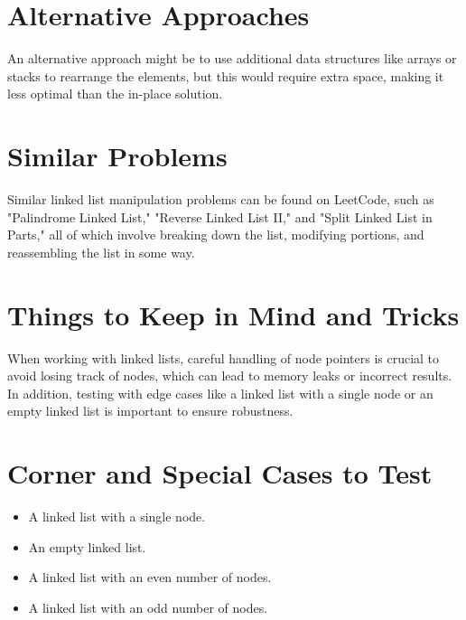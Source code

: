 \section*{Alternative Approaches}
An alternative approach might be to use additional data structures like arrays or stacks to rearrange the elements, but this would require extra space, making it less optimal than the in-place solution.

\section*{Similar Problems}
Similar linked list manipulation problems can be found on LeetCode, such as "Palindrome Linked List," "Reverse Linked List II," and "Split Linked List in Parts," all of which involve breaking down the list, modifying portions, and reassembling the list in some way.

\section*{Things to Keep in Mind and Tricks}
When working with linked lists, careful handling of node pointers is crucial to avoid losing track of nodes, which can lead to memory leaks or incorrect results. In addition, testing with edge cases like a linked list with a single node or an empty linked list is important to ensure robustness.

\section*{Corner and Special Cases to Test}
\begin{itemize}
    \item A linked list with a single node.
    \item An empty linked list.
    \item A linked list with an even number of nodes.
    \item A linked list with an odd number of nodes.
\end{itemize}
